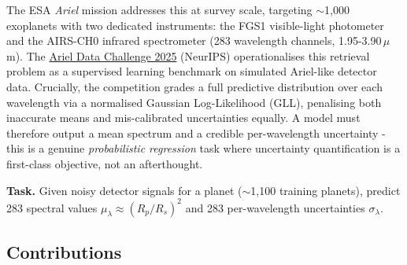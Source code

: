 \documentclass[12pt]{article}
\begin{document}
The ESA \emph{Ariel} mission addresses this at survey scale, targeting $\sim$1,000 exoplanets with two dedicated instruments: the FGS1 visible-light photometer and the AIRS-CH0 infrared spectrometer (283 wavelength channels, 1.95-3.90\,$\mu$m). The \href{https://www.kaggle.com/competitions/ariel-data-challenge-2025}{Ariel Data Challenge 2025} (NeurIPS) operationalises this retrieval problem as a supervised learning benchmark on simulated Ariel-like detector data. Crucially, the competition grades a full predictive distribution over each wavelength via a normalised Gaussian Log-Likelihood (GLL), penalising both inaccurate means and mis-calibrated uncertainties equally. A model must therefore output a mean spectrum and a credible per-wavelength uncertainty - this is a genuine \emph{probabilistic regression} task where uncertainty quantification is a first-class objective, not an afterthought.

\textbf{Task.} Given noisy detector signals for a planet ($\sim$1,100 training planets), predict 283 spectral values $\mu_\lambda \approx (R_p/R_s)^2$ and 283 per-wavelength uncertainties $\sigma_\lambda$.

\subsection{Contributions}
\end{document}

